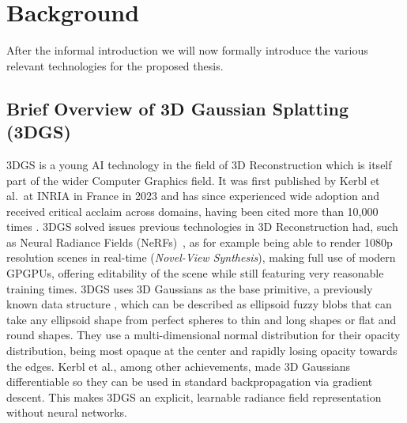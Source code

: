 \section{Background}

After the informal introduction we will now formally introduce the various relevant technologies for the proposed thesis.

\subsection{Brief Overview of 3D Gaussian Splatting (3DGS)}
3DGS is a young AI technology in the field of 3D Reconstruction which is itself part of the wider Computer Graphics field. It was first published by Kerbl et al.\ at INRIA in France in 2023 \cite{kerbl3DGaussianSplatting2023} and has since experienced wide adoption and received critical acclaim across domains, having been cited more than 10,000 times \cite{semanticScholarKerbl,researchGateKerbl}.
3DGS solved issues previous technologies in 3D Reconstruction had, such as Neural Radiance Fields (NeRFs)~\cite{mildenhallNeRFRepresentingScenes2020}, as for example being able to render 1080p resolution scenes in real-time (\textit{Novel-View Synthesis}), making full use of modern GPGPUs, offering editability of the scene while still featuring very reasonable training times.
3DGS uses 3D Gaussians as the base primitive, a previously known data structure \cite{zwickerEWAVolumeSplatting2001,zwickerSurfaceSplatting2001}, which can be described as ellipsoid fuzzy blobs that can take any ellipsoid shape from perfect spheres to thin and long shapes or flat and round shapes.
They use a multi-dimensional normal distribution for their opacity distribution, being most opaque at the center and rapidly losing opacity towards the edges. Kerbl et al., among other achievements, made 3D Gaussians differentiable so they can be used in standard backpropagation via gradient descent.
This makes 3DGS an explicit, learnable radiance field representation without neural networks.

